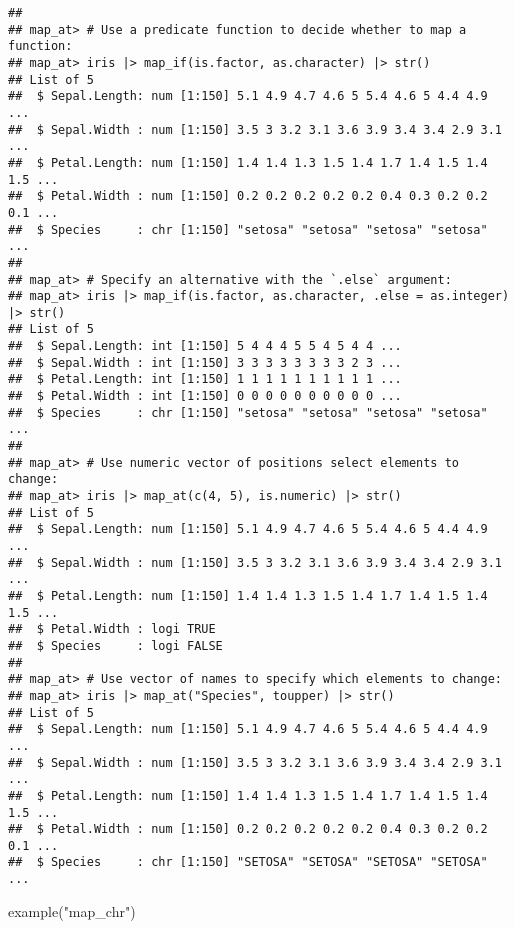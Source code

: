 \documentclass[
]{book}
\newenvironment{Shaded}{\begin{snugshade}}{\end{snugshade}}
\newcommand{\FunctionTok}[1]{\textcolor[rgb]{0.00,0.00,0.00}{#1}}
\newcommand{\NormalTok}[1]{#1}
\newcommand{\StringTok}[1]{\textcolor[rgb]{0.31,0.60,0.02}{#1}}
\begin{document}
\begin{verbatim}
## 
## map_at> # Use a predicate function to decide whether to map a function:
## map_at> iris |> map_if(is.factor, as.character) |> str()
## List of 5
##  $ Sepal.Length: num [1:150] 5.1 4.9 4.7 4.6 5 5.4 4.6 5 4.4 4.9 ...
##  $ Sepal.Width : num [1:150] 3.5 3 3.2 3.1 3.6 3.9 3.4 3.4 2.9 3.1 ...
##  $ Petal.Length: num [1:150] 1.4 1.4 1.3 1.5 1.4 1.7 1.4 1.5 1.4 1.5 ...
##  $ Petal.Width : num [1:150] 0.2 0.2 0.2 0.2 0.2 0.4 0.3 0.2 0.2 0.1 ...
##  $ Species     : chr [1:150] "setosa" "setosa" "setosa" "setosa" ...
## 
## map_at> # Specify an alternative with the `.else` argument:
## map_at> iris |> map_if(is.factor, as.character, .else = as.integer) |> str()
## List of 5
##  $ Sepal.Length: int [1:150] 5 4 4 4 5 5 4 5 4 4 ...
##  $ Sepal.Width : int [1:150] 3 3 3 3 3 3 3 3 2 3 ...
##  $ Petal.Length: int [1:150] 1 1 1 1 1 1 1 1 1 1 ...
##  $ Petal.Width : int [1:150] 0 0 0 0 0 0 0 0 0 0 ...
##  $ Species     : chr [1:150] "setosa" "setosa" "setosa" "setosa" ...
## 
## map_at> # Use numeric vector of positions select elements to change:
## map_at> iris |> map_at(c(4, 5), is.numeric) |> str()
## List of 5
##  $ Sepal.Length: num [1:150] 5.1 4.9 4.7 4.6 5 5.4 4.6 5 4.4 4.9 ...
##  $ Sepal.Width : num [1:150] 3.5 3 3.2 3.1 3.6 3.9 3.4 3.4 2.9 3.1 ...
##  $ Petal.Length: num [1:150] 1.4 1.4 1.3 1.5 1.4 1.7 1.4 1.5 1.4 1.5 ...
##  $ Petal.Width : logi TRUE
##  $ Species     : logi FALSE
## 
## map_at> # Use vector of names to specify which elements to change:
## map_at> iris |> map_at("Species", toupper) |> str()
## List of 5
##  $ Sepal.Length: num [1:150] 5.1 4.9 4.7 4.6 5 5.4 4.6 5 4.4 4.9 ...
##  $ Sepal.Width : num [1:150] 3.5 3 3.2 3.1 3.6 3.9 3.4 3.4 2.9 3.1 ...
##  $ Petal.Length: num [1:150] 1.4 1.4 1.3 1.5 1.4 1.7 1.4 1.5 1.4 1.5 ...
##  $ Petal.Width : num [1:150] 0.2 0.2 0.2 0.2 0.2 0.4 0.3 0.2 0.2 0.1 ...
##  $ Species     : chr [1:150] "SETOSA" "SETOSA" "SETOSA" "SETOSA" ...
\end{verbatim}

\begin{Shaded}
\begin{Highlighting}[]
\FunctionTok{example}\NormalTok{(}\StringTok{"map\_chr"}\NormalTok{)}
\end{Highlighting}
\end{Shaded}
\end{document}
